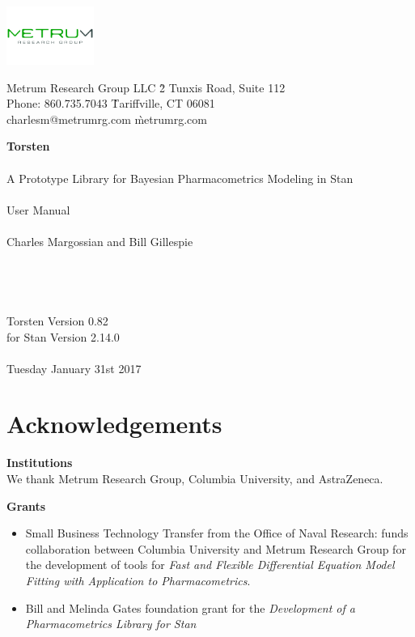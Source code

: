 \documentclass[11pt]{amsart}
\let\oldsection\section
\renewcommand\section{\clearpage\oldsection}
\begin{document}
\begin{center}
\includegraphics[height=0.75in]{graphics/logo.pdf}\\
\textcolor{MRGGreen}{\sf
\begin{tabbing}
Metrum Research Group LLC \` 2 Tunxis Road, Suite 112 \\
Phone: 860.735.7043 \` Tariffville, CT 06081 \\
charlesm@metrumrg.com \` metrumrg.com \\
\end{tabbing}
}
{\Huge \textbf{Torsten} \\ \ \\  \huge A Prototype Library for Bayesian Pharmacometrics Modeling in Stan \\ \ \\
User Manual \\ \ \\ 
\Large Charles Margossian and Bill Gillespie \\ \ \\ \ \\ \ \\ \ \\
Torsten Version 0.82 \\ for Stan Version 2.14.0 \\ \ \\ 
\large Tuesday January 31st 2017 }
\end{center}

\clearpage

\tableofcontents

\section*{Acknowledgements}

{\bf Institutions} \ \\
We thank Metrum Research Group, Columbia University, and AstraZeneca.

{\bf Grants}
\begin{itemize}
  \item Small Business Technology Transfer from the Office of Naval Research: funds collaboration between Columbia University and Metrum Research Group for the development of tools for \textit{Fast and Flexible Differential Equation Model Fitting with Application to Pharmacometrics}.
  \item  Bill and Melinda Gates foundation grant for the \textit{Development of a Pharmacometrics Library for Stan}
\end{itemize}
\end{document}
